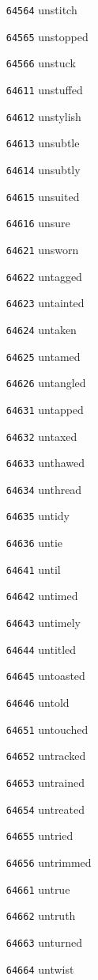 \documentclass[twoside,11pt]{article}
\begin{document}
\begin{multicols}{5}
\begin{enumerate}
\item[\texttt{64564}] unstitch
\item[\texttt{64565}] unstopped
\item[\texttt{64566}] unstuck
\item[\texttt{64611}] unstuffed
\item[\texttt{64612}] unstylish
\item[\texttt{64613}] unsubtle
\item[\texttt{64614}] unsubtly
\item[\texttt{64615}] unsuited
\item[\texttt{64616}] unsure
\item[\texttt{64621}] unsworn
\item[\texttt{64622}] untagged
\item[\texttt{64623}] untainted
\item[\texttt{64624}] untaken
\item[\texttt{64625}] untamed
\item[\texttt{64626}] untangled
\item[\texttt{64631}] untapped
\item[\texttt{64632}] untaxed
\item[\texttt{64633}] unthawed
\item[\texttt{64634}] unthread
\item[\texttt{64635}] untidy
\item[\texttt{64636}] untie
\item[\texttt{64641}] until
\item[\texttt{64642}] untimed
\item[\texttt{64643}] untimely
\item[\texttt{64644}] untitled
\item[\texttt{64645}] untoasted
\item[\texttt{64646}] untold
\item[\texttt{64651}] untouched
\item[\texttt{64652}] untracked
\item[\texttt{64653}] untrained
\item[\texttt{64654}] untreated
\item[\texttt{64655}] untried
\item[\texttt{64656}] untrimmed
\item[\texttt{64661}] untrue
\item[\texttt{64662}] untruth
\item[\texttt{64663}] unturned
\item[\texttt{64664}] untwist

\end{enumerate}
\end{multicols}
\end{document}
